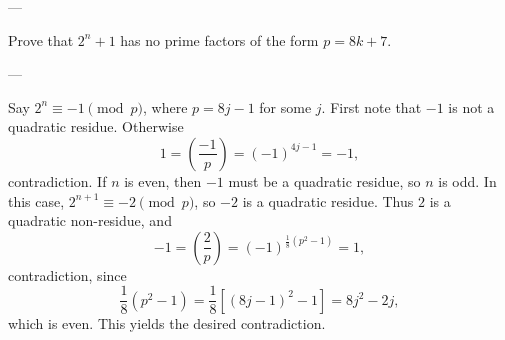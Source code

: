 
---

Prove that $2^n+1$ has no prime factors of the form $p=8k+7$.

---

Say $2^n\equiv-1\pmod p$, where $p=8j-1$ for some $j$. First note that $-1$ is not a quadratic residue. Otherwise \[1=\left(\frac{-1}p\right)=(-1)^{4j-1}=-1,\]
contradiction. If $n$ is even, then $-1$ must be a quadratic residue, so $n$ is odd. In this case, $2^{n+1}\equiv-2\pmod p$, so $-2$ is a quadratic residue. Thus $2$ is a quadratic non-residue, and \[-1=\left(\frac2p\right)=(-1)^{\tfrac18\left(p^2-1\right)}=1,\]
contradiction, since \[\frac18\left(p^2-1\right)=\frac18\left[(8j-1)^2-1\right]=8j^2-2j,\]
which is even. This yields the desired contradiction.



